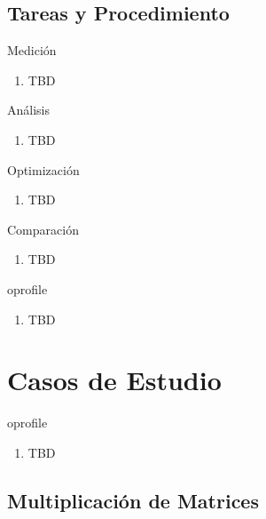\documentclass{beamer}
\begin{document}
\subsection{Tareas y Procedimiento}

\begin{frame}{Medición}
	\begin{enumerate}
	\item TBD 
	\end{enumerate}
\end{frame}

\begin{frame}{Análisis}
	\begin{enumerate}
	\item TBD 
	\end{enumerate}
\end{frame}

\begin{frame}{Optimización}
	\begin{enumerate}
	\item TBD 
	\end{enumerate}
\end{frame}

\begin{frame}{Comparación}
	\begin{enumerate}
	\item TBD 
	\end{enumerate}
\end{frame}

\begin{frame}{oprofile}
	\begin{enumerate}
	\item TBD 
	\end{enumerate}
\end{frame}

\section{Casos de Estudio}

\begin{frame}{oprofile}
	\begin{enumerate}
	\item TBD 
	\end{enumerate}
\end{frame}

\subsection{Multiplicación de Matrices}
\end{document}
